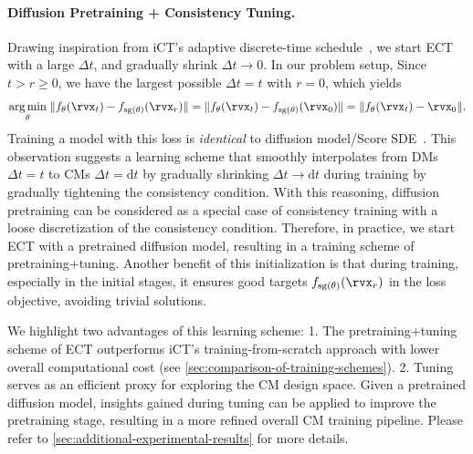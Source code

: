 \documentclass{article}
\begin{document}
\paragraph{Diffusion Pretraining + Consistency Tuning.} Drawing inspiration from iCT's adaptive discrete-time schedule~\citep{ict}, we start ECT with a large $\Delta t$, and gradually shrink $\Delta t \to 0$. In our problem setup, Since $t > r \geq 0$, we have the largest possible $\Delta t = t$ with $r=0$, which yields
%
\begin{equation}
\underset{\theta}{\arg \min} \; \| f_\theta(\x_t) - f_{\operatorname{sg}(\theta)}(\x_r) \| 
= \| f_\theta(\x_t) - f_{\operatorname{sg}(\theta)}(\x_0) \| 
= \| f_\theta(\x_t) -\x_0 \|.
\end{equation}
Training a model with this loss is \emph{identical} to diffusion model/Score SDE~\citep{ho2020denoising,scoresde}. This observation suggests a learning scheme that smoothly interpolates from DMs $\Delta t = t$ to CMs $\Delta t = \mathrm{d}t$ by gradually shrinking $\Delta t \to \mathrm{d}t$ during training by gradually tightening the consistency condition.
With this reasoning, diffusion pretraining can be considered as a special case of consistency training with a loose discretization of the consistency condition. 
%
Therefore, in practice, we start ECT with a pretrained diffusion model, resulting in a training scheme of pretraining+tuning.
%
Another benefit of this initialization is that during training, especially in the initial stages, it ensures good targets $f_{\operatorname{sg}(\theta)}(\x_r)$ in the loss objective, avoiding trivial solutions.
%

We highlight two advantages of this learning scheme: 
1. The pretraining+tuning scheme of ECT outperforms iCT's training-from-scratch approach with lower overall computational cost (see \cref{sec:comparison-of-training-schemes}).
2. Tuning serves as an efficient proxy for exploring the CM design space. Given a pretrained diffusion model, insights gained during tuning can be applied to improve the pretraining stage, resulting in a more refined overall CM training pipeline.
Please refer to \cref{sec:additional-experimental-results} for more details.
\end{document}
